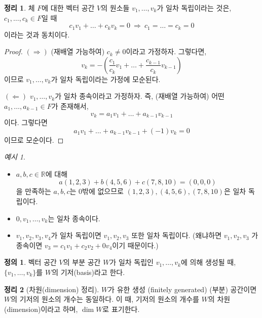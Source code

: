 \documentclass[unfonts,oneside,a4paper]{oblivoir}
\theoremstyle{definition}
\newtheorem{definition}{정의}
\theoremstyle{theorem}
\newtheorem{theorem}{정리}
\theoremstyle{remark}
\theoremstyle{remark}
\theoremstyle{remark}
\newtheorem*{example}{예시}
\theoremstyle{remark}
\renewcommand{\vec}[1]{\bm{\mathit{#1}}}
\newcommand{\vecz}{\bm{\mathrm{0}}}
\begin{document}
\begin{theorem}
    체 $F$에 대한 벡터 공간 $V$의 원소들 $\vec v_1, \dots, \vec v_k$가 일차 독립이라는 것은, $c_1, \dots, c_k \in F$일 때
    \[
        c_1 \vec v_1 + \dots + c_k \vec v_k = \vecz\ \Rightarrow\ c_1 = \dots = c_k = 0
    \]
    이라는 것과 동치이다.
\end{theorem}

\begin{proof}
    $(\Rightarrow)$ (재배열 가능하여) $c_k \neq 0$이라고 가정하자.
    그렇다면,
    \[
        \vec v_k = - \left(\frac{c_1}{c_k} \vec v_1 + \dots + \frac{c_{k - 1}}{c_k} \vec v_{k - 1}\right)
    \]
    이므로 $\vec v_1, \dots, \vec v_k$가 일차 독립이라는 가정에 모순된다.

    $(\Leftarrow)$ $\vec v_1, \dots, \vec v_k$가 일차 종속이라고 가정하자.
    즉, (재배열 가능하여) 어떤 $a_1, \dots, a_{k - 1} \in F$가 존재해서,
    \[
        \vec v_k = a_1 \vec v_1 + \dots + a_{k - 1} \vec v_{k - 1}
    \]
    이다.
    그렇다면
    \[
        a_1 \vec v_1 + \dots + a_{k - 1} \vec v_{k - 1} + (-1) \vec v_k = \vecz
    \]
    이므로 모순이다.
\end{proof}

\begin{example}
    \leavevmode
    \begin{itemize}
        \item $a, b, c \in \mathbb R$에 대해
            \[
                a(1, 2, 3) + b(4, 5, 6) + c(7, 8, 10) = (0, 0, 0)
            \]
            을 만족하는 $a, b, c$는 0밖에 없으므로 $(1, 2, 3), (4, 5, 6), (7, 8, 10)$은 일차 독립이다.
        \item $\vecz, \vec v_1, \dots, \vec v_k$는 일차 종속이다.
        \item $\vec v_1, \vec v_2, \vec v_3, \vec v_4$가 일차 독립이면 $\vec v_1, \vec v_2, \vec v_3$ 또한 일차 독립이다.
            (왜냐하면 $\vec v_1, \vec v_2, \vec v_3$ 가 종속이면 $\vec v_3 = c_1 \vec v_1 + c_2 \vec v_2 + 0 \vec v_4$이기 때문이다.)
    \end{itemize}
\end{example}

\begin{definition}
    벡터 공간 $V$의 부분 공간 $W$가 일차 독립인 $\vec v_1, \dots, \vec v_k$에 의해 생성될 때, $\{ \vec v_1, \dots, \vec v_k\}$를 $W$의 기저(basis)라고 한다.
\end{definition}

\begin{theorem}[차원(dimension) 정리] \label{thm:dimension}
    $W$가 유한 생성 (finitely generated) (부분) 공간이면 $W$의 기저의 원소의 개수는 동일하다.
    이 때, 기저의 원소의 개수를 $W$의 차원(dimension)이라고 하며, $\dim W$로 표기한다.
\end{theorem}
\end{document}
